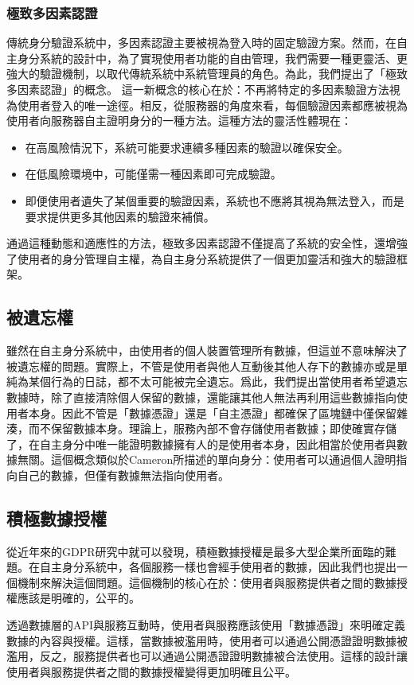 \subsubsection{極致多因素認證}
傳統身分驗證系統中，多因素認證主要被視為登入時的固定驗證方案。然而，在自主身分系統的設計中，為了實現使用者功能的自由管理，我們需要一種更靈活、更強大的驗證機制，以取代傳統系統中系統管理員的角色。為此，我們提出了「極致多因素認證」的概念。
這一新概念的核心在於：不再將特定的多因素驗證方法視為使用者登入的唯一途徑。相反，從服務器的角度來看，每個驗證因素都應被視為使用者向服務器自主證明身分的一種方法。這種方法的靈活性體現在：
\begin{itemize}
  \item 在高風險情況下，系統可能要求連續多種因素的驗證以確保安全。
  \item 在低風險環境中，可能僅需一種因素即可完成驗證。
  \item 即便使用者遺失了某個重要的驗證因素，系統也不應將其視為無法登入，而是要求提供更多其他因素的驗證來補償。
\end{itemize}
通過這種動態和適應性的方法，極致多因素認證不僅提高了系統的安全性，還增強了使用者的身分管理自主權，為自主身分系統提供了一個更加靈活和強大的驗證框架。
\subsection{被遺忘權}
雖然在自主身分系統中，由使用者的個人裝置管理所有數據，但這並不意味解決了被遺忘權的問題。實際上，不管是使用者與他人互動後其他人存下的數據亦或是單純為某個行為的日誌，都不太可能被完全遺忘。爲此，我們提出當使用者希望遺忘數據時，除了直接清除個人保留的數據，還能讓其他人無法再利用這些數據指向使用者本身。因此不管是「數據憑證」還是「自主憑證」都確保了區塊鏈中僅保留雜湊，而不保留數據本身。理論上，服務內部不會存儲使用者數據；即使確實存儲了，在自主身分中唯一能證明數據擁有人的是使用者本身，因此相當於使用者與數據無關。這個概念類似於Cameron\cite{cameron2005laws}所描述的單向身分：使用者可以通過個人證明指向自己的數據，但僅有數據無法指向使用者。
\subsection{積極數據授權}
從近年來的GDPR研究中就可以發現，積極數據授權是最多大型企業所面臨的難題。在自主身分系統中，各個服務一樣也會經手使用者的數據，因此我們也提出一個機制來解決這個問題。這個機制的核心在於：使用者與服務提供者之間的數據授權應該是明確的，公平的。

透過數據層的API與服務互動時，使用者與服務應該使用「數據憑證」來明確定義數據的內容與授權。這樣，當數據被濫用時，使用者可以通過公開憑證證明數據被濫用，反之，服務提供者也可以通過公開憑證證明數據被合法使用。這樣的設計讓使用者與服務提供者之間的數據授權變得更加明確且公平。

